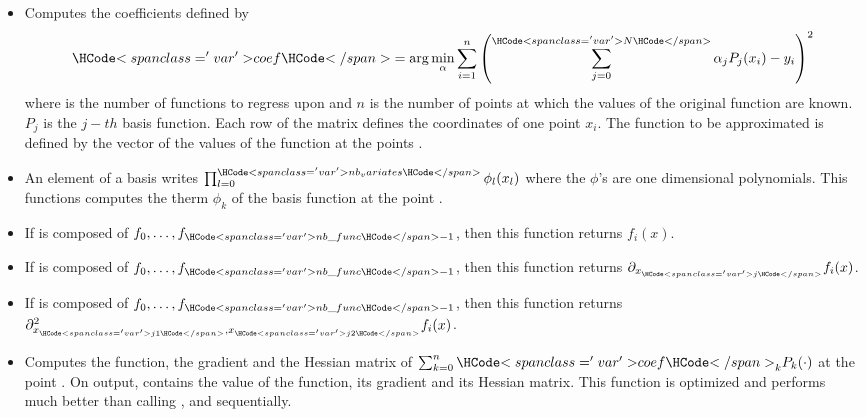 \begin{itemize}
\item {}
  \sshortdescribe Computes the coefficients  defined by
  \begin{equation*}
    \var{coef} = \arg\min_\alpha \sum_{i=1}^n
    \left( \sum_{j=0}^{\var{N}} \alpha_j  P_j(x_i) - y_i\right)^2
  \end{equation*}
  where  is the number of functions to regress upon and $n$ is the number
  of points at which the values of the original function are known. $P_j$ is the
  $j-th$ basis function. Each row of the matrix  defines the coordinates
  of one point $x_i$. The function to be approximated is defined by the vector
   of the values of the function at the points .

\item {}
  \sshortdescribe An element of a basis writes $\prod_{l=0}^{\var{nb_variates}}
  \phi_l(x_l)$ where the $\phi$'s are one dimensional polynomials. This
  functions computes the therm $\phi_k$ of the  basis function at the
  point .
\item {}
  \sshortdescribe If  is composed of $f_0, \dots, f_{\var{nb\_func}-1}$,
  then this function returns $f_i(x)$. 

\item {}
  \sshortdescribe If  is composed of $f_0, \dots, f_{\var{nb\_func}-1}$,
  then this function returns $\partial_{x_{\var{j}}} f_i(x)$.

  
\item {}
  \sshortdescribe If  is composed of $f_0, \dots, f_{\var{nb\_func}-1}$,
  then this function returns $\partial^2_{x_{\var{j1}}, x_{\var{j2}}}
  f_i(x)$.


\item {}
  \sshortdescribe Computes the function, the gradient and the Hessian matrix
  of $\sum_{k=0}^n \var{coef}_k  P_k(\cdot)$ at the point .
  On output,  contains the value of the function,  its
  gradient and  its Hessian matrix. This function is optimized and
  performs much better than calling ,
   and  sequentially.


\end{itemize}
